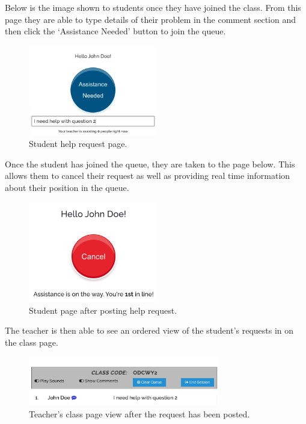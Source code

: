\documentclass[a4paper,11pt]{article}
\begin{document}
Below is the image shown to students once they have joined the class. From this page they are able to type details of their problem in the comment section and then click the `Assistance Needed' button to join the queue.

\FloatBarrier
\begin{figure}[H]
  \centering
  \includegraphics[width=0.5\textwidth]{cq4.png}
  \caption{Student help request page.}
\end{figure}

Once the student has joined the queue, they are taken to the page below. This allows them to cancel their request as well as providing real time information about their position in the queue.

\FloatBarrier
\begin{figure}[H]
  \centering
  \includegraphics[width=0.5\textwidth]{cq5.png}
  \caption{Student page after posting help request.}
\end{figure}

The teacher is then able to see an ordered view of the student's requests in on the class page.

\FloatBarrier
\begin{figure}[H]
  \centering
  \includegraphics[width=0.75\textwidth]{cq6.png}
  \caption{Teacher's class page view after the request has been posted.}
\end{figure}
\end{document}
